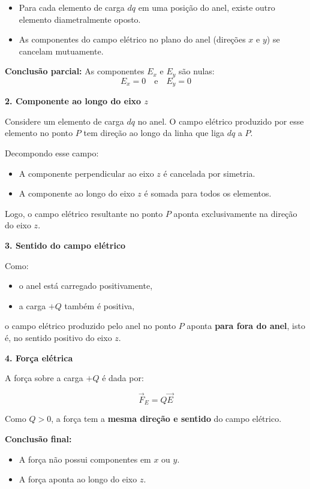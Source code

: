 \documentclass[a4paper,12pt]{article}
\begin{document}
\begin{itemize}
\item Para cada elemento de carga $dq$ em uma posição do anel, existe outro elemento diametralmente oposto.
\item As componentes do campo elétrico no plano do anel (direções $x$ e $y$) se cancelam mutuamente.
\end{itemize}

\textbf{Conclusão parcial:}  
As componentes $E_x$ e $E_y$ são nulas:
\[
E_x = 0 \quad \text{e} \quad E_y = 0
\]

\textbf{2. Componente ao longo do eixo $z$}

Considere um elemento de carga $dq$ no anel. O campo elétrico produzido por esse elemento no ponto $P$ tem direção ao longo da linha que liga $dq$ a $P$.

Decompondo esse campo:

\begin{itemize}
\item A componente perpendicular ao eixo $z$ é cancelada por simetria.
\item A componente ao longo do eixo $z$ é somada para todos os elementos.
\end{itemize}

Logo, o campo elétrico resultante no ponto $P$ aponta exclusivamente na direção do eixo $z$.

\textbf{3. Sentido do campo elétrico}

Como:

\begin{itemize}
\item o anel está carregado positivamente,
\item a carga $+Q$ também é positiva,
\end{itemize}

o campo elétrico produzido pelo anel no ponto $P$ aponta \textbf{para fora do anel}, isto é, no sentido positivo do eixo $z$.

\textbf{4. Força elétrica}

A força sobre a carga $+Q$ é dada por:

\[
\vec{F}_E = Q \vec{E}
\]

Como $Q > 0$, a força tem a \textbf{mesma direção e sentido} do campo elétrico.

\textbf{Conclusão final:}

\begin{itemize}
\item A força não possui componentes em $x$ ou $y$.
\item A força aponta ao longo do eixo $z$.
\end{itemize}
\end{document}

